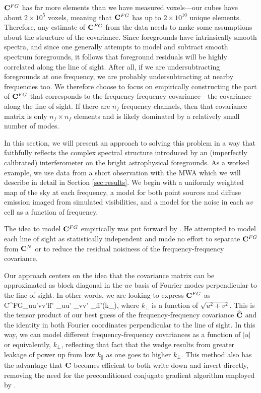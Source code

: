 $\mathbf{C}^{FG}$ has far more elements than we have measured voxels---our cubes have about $2\times 10^5$ voxels, meaning that $\mathbf{C}^{FG}$ has up to $2\times 10^{10}$ unique elements. Therefore, any estimate of $\mathbf{C}^{FG}$ from the data needs to make some assumptions about the structure of the covariance. Since foregrounds have intrinsically smooth spectra, and since one generally attempts to model and subtract smooth spectrum foregrounds, it follows that foreground residuals will be highly correlated along the line of sight. After all, if we are undersubtracting foregrounds at one frequency, we are probably undersubtracting at nearby frequencies too. We therefore choose to focus on empirically constructing the part of $\mathbf{C}^{FG}$ that corresponds to the frequency-frequency covariance---the covariance along the line of sight.  If there are $n_f$ frequency channels, then that covariance matrix is only $n_f \times n_f$ elements and is likely dominated by a relatively small number of modes. 

In this section, we will present an approach to solving this problem in a way that faithfully reflects the complex spectral structure introduced by an (imperfectly calibrated) interferometer on the bright astrophysical foregrounds. As a worked example, we use data from a short observation with the MWA which we will describe in detail in Section \ref{sec:results}. We begin with a uniformly weighted map of the sky at each frequency, a model for both point sources and diffuse emission imaged from simulated visibilities, and a model for the noise in each $uv$ cell as a function of frequency.

The idea to model $\mathbf{C}^{FG}$ empirically was put forward by \citet{LiuThesis}. He attempted to model each line of sight as statistically independent and made no effort to separate $\mathbf{C}^{FG}$ from $\mathbf{C}^{N}$ or to reduce the residual noisiness of the frequency-frequency covariance.  

Our approach centers on the idea that the covariance matrix can be approximated as block diagonal in the $uv$ basis of Fourier modes perpendicular to the line of sight. In other words, we are looking to express $\mathbf{C}^{FG}$ as
\beq
C^{FG}_{uu'vv'ff'} \approx \delta_{uu'} \delta_{vv'} _{ff'}(k_\perp), \label{eq:blockdiag}
\eeq
where $k_\perp$ is a function of $\sqrt{u^2+v^2}$. This is the tensor product of our best guess of the frequency-frequency covariance $\widehat{\mathbf{C}}$ and the identity in both Fourier coordinates perpendicular to the line of sight. In this way, we can model different frequency-frequency covariances as a function of $|u|$ or equivalently, $k_\perp$, reflecting that fact that the wedge results from greater leakage of power up from low $k_{\|}$ as one goes to higher $k_\perp$. This method also has the advantage that $\mathbf{C}$ becomes efficient to both write down and invert directly, removing the need for the preconditioned conjugate gradient algorithm employed by \cite{DillonFast}.

